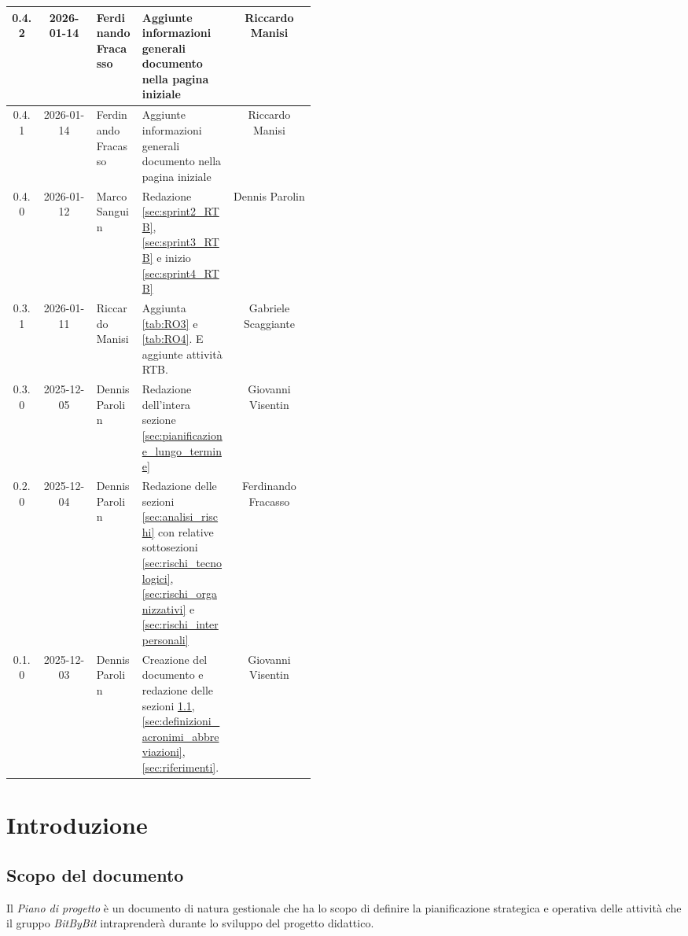 \documentclass[a4paper,12pt]{article}
\begin{document}
\begin{center}
\begin{longtable}{|c|c|>{\raggedright\arraybackslash}p{0.15\linewidth}|>{\raggedright\arraybackslash}p{0.3\linewidth}|c|}
\hline
\rowcolor{white}
0.4.2 & 2026-01-14 & Ferdinando Fracasso & Aggiunte informazioni generali documento nella pagina iniziale & Riccardo Manisi \\
\hline
\rowcolor{gray!20}
0.4.1 & 2026-01-14 & Ferdinando Fracasso & Aggiunte informazioni generali documento nella pagina iniziale & Riccardo Manisi \\
\hline
\rowcolor{white}
0.4.0 & 2026-01-12 & Marco Sanguin & Redazione \ref{sec:sprint2_RTB}, \ref{sec:sprint3_RTB} e inizio \ref{sec:sprint4_RTB} & Dennis Parolin \\
\hline
\rowcolor{gray!20}
0.3.1 & 2026-01-11 & Riccardo Manisi & Aggiunta \ref{tab:RO3} e \ref{tab:RO4}. E aggiunte attività RTB. & Gabriele Scaggiante \\
\hline
\rowcolor{white}
0.3.0 & 2025-12-05 & Dennis Parolin & Redazione dell'intera sezione \ref{sec:pianificazione_lungo_termine} & Giovanni Visentin \\
\hline
\rowcolor{gray!20}
0.2.0 & 2025-12-04 & Dennis Parolin & Redazione delle sezioni \ref{sec:analisi_rischi} con relative sottosezioni \ref{sec:rischi_tecnologici}, \ref{sec:rischi_organizzativi} e \ref{sec:rischi_interpersonali} & Ferdinando Fracasso \\
\hline
\rowcolor{white}
0.1.0 & 2025-12-03 & Dennis Parolin & Creazione del documento e redazione delle sezioni \ref{sec:scopo_documento}, \ref{sec:definizioni_acronimi_abbreviazioni}, \ref{sec:riferimenti}. & Giovanni Visentin \\
\hline
\end{longtable}
\end{center}

\clearpage
\tableofcontents
\thispagestyle{empty}
\clearpage

\listoftables
\clearpage


\section{Introduzione}

\subsection{Scopo del documento} \label{sec:scopo_documento}
Il \textit{Piano di progetto} è un documento di natura gestionale che ha lo scopo di definire la pianificazione strategica e operativa delle attività che il gruppo \textit{BitByBit} intraprenderà durante lo sviluppo del progetto didattico.
\end{document}
